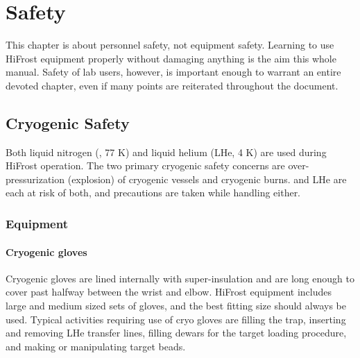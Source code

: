 \chapter{Safety} 
\label{safety}
This chapter is about personnel safety, not equipment safety.  Learning to use HiFrost equipment properly without damaging anything is the aim this whole manual.  Safety of lab users, however, is important enough to warrant an entire devoted chapter, even if many points are reiterated throughout the document.

\vspace{1cm}

\section{Cryogenic Safety}
Both liquid nitrogen (\lnn, 77 K) and liquid helium (LHe, 4 K) are used during HiFrost operation.  The two primary cryogenic safety concerns are over-pressurization (explosion) of cryogenic vessels and cryogenic burns.  \lnn{} and LHe are each at risk of both, and precautions are taken while handling either. 
\subsection{Equipment}
\subsubsection{Cryogenic gloves}
Cryogenic gloves are lined internally with super-insulation and are long enough to cover past halfway between the wrist and elbow.  HiFrost equipment includes large and medium sized sets of gloves, and the best fitting size should always be used.  Typical activities requiring use of cryo gloves are filling the \lnn{} trap, inserting and removing LHe transfer lines, filling \lnn{} dewars for the target loading procedure, and making or manipulating target beads.

